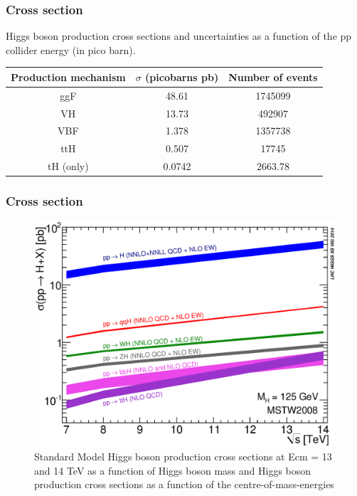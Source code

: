 \documentclass[11pt]{beamer}
\begin{document}
\begin{frame}
\frametitle{Cross section}
Higgs boson production cross sections and uncertainties as a function of the pp collider energy (in
pico barn)\footnotemark.\\

\begin{tabular}{|c|c|c|}
\hline

Production mechanism &
$\sigma$ (picobarns pb)
&Number of events \\
\hline
ggF &
48.61&
1745099\\
\hline
VH &
13.73&
492907\\
\hline
VBF &
1.378&
1357738\\
\hline
ttH &
0.507&
17745\\
\hline
tH	 (only)&
0.0742&
2663.78\\
\hline
\end{tabular}



\end{frame}

\begin{frame}
\frametitle{Cross section}
\begin{center}
\begin{figure}
\includegraphics[scale=0.42]{figures/7-14xsec.eps}
\caption{Standard Model Higgs boson production cross sections at Ecm = 13 and 14 TeV as a function of Higgs boson
	mass and Higgs boson production cross sections as a function of the centre-of-mass-energies
}	
\end{figure}
\end{center}
\end{frame}
\end{document}
